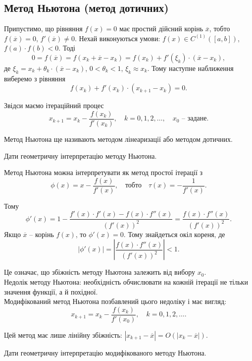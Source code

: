 \subsection{Метод Ньютона (метод дотичних)}

Припустимо, що рівняння $f (x) = 0$ має простий дійсний корінь $\overline{x}$, тобто $f (\overline{x}) = 0$, $f'(\overline{x}) \ne 0$. Нехай виконуються умови: $f (x)\in C^{(1)}([a,b])$, $f (a)\cdot f (b) < 0$. Тоді 
\[0 = f (\overline{x}) = f (x_k + \overline{x} - x_k ) = f (x_k ) + f'(\xi_k ) \cdot (\overline{x} - x_k ),\] 
де $\xi_k=x_k+\theta_k \cdot (\overline{x}-x_k)$, $0 < \theta_k < 1$, $\xi_k \approx x_k$. Тому наступне наближення виберемо з рівняння 
\[ f(x_k) + f'(x_k) \cdot (x_{k+1}-x_k) = 0.\]

Звідси маємо ітераційний процес
\[ x_{k+1} = x_k - \dfrac{f(x_k)}{f'(x_k)}, \quad k = 0,1,2,\ldots, \quad x_0\text{ -- задане}. \]

Метод Ньютона ще називають методом лінеаризації або методом дотичних.

\begin{problem} 
	Дати геометричну інтерпретацію методу Ньютона.
\end{problem}

Метод Ньютона можна інтерпретувати як метод простої ітерації з \[ \phi(x) = x - \dfrac{f(x)}{f'(x)}, \quad \text{тобто} \quad \tau(x) = - \dfrac{1}{f'(x)}. \]

Тому 
\[ \phi'(x) = 1 - \dfrac{f'(x)\cdot f'(x)-f(x)\cdot f''(x)}{(f'(x))^2} = \dfrac{f(x)\cdot f''(x)}{(f'(x))^2}.\]
Якщо $\overline{x}$ -- корінь $f(x)$, то $\phi'(x) = 0$. Тому знайдеться окіл кореня, де \[ |\phi'(x)| = \left|\dfrac{f(x)\cdot f''(x)}{(f'(x))^2}\right|<1.\]

Це означає, що збіжність методу Ньютона залежить від вибору $x_0$. \\

Недолік методу Ньютона: необхідність обчислювати на кожній ітерації не тільки значення функції, а й похідної. \\

Модифікований метод Ньютона позбавлений цього недоліку і має вигляд:
\[ x_{k+1} = x_k - \dfrac{f(x_k)}{f'(x_0)}, \quad k=0,1,2,\ldots. \]

Цей метод має лише лінійну збіжність: $|x_{k+1} - \overline{x}| = O(|x_k-\overline{x}|)$.
\begin{problem} 
	Дати геометричну інтерпретацію модифікованого методу Ньютона.
\end{problem}

